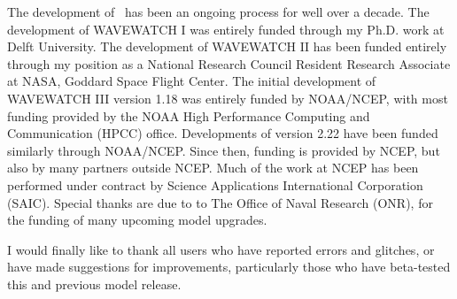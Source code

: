 The development of \ws\ has been an ongoing process for well over a
decade. The development of WAVEWATCH I was entirely funded through my
Ph.D. work at Delft University. The development of WAVEWATCH II has been
funded entirely through my position as a National Research Council Resident
Research Associate at NASA, Goddard Space Flight Center. The initial
development of WAVEWATCH III version 1.18 was entirely funded by NOAA/NCEP,
with most funding provided by the NOAA High Performance Computing and
Communication (HPCC) office. Developments of version 2.22 have been funded
similarly through NOAA/NCEP. Since then, funding is provided by NCEP, but also
by many partners outside NCEP. Much of the work at NCEP has been performed
under contract by Science Applications International Corporation (SAIC).
Special thanks are due to to The Office of Naval Research (ONR), for the
funding of many upcoming model upgrades.

I would finally like to thank all users who have reported errors and glitches,
or have made suggestions for improvements, particularly those who have
beta-tested this and previous model release.


